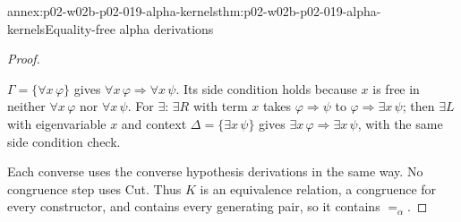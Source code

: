 \begin{annexitem}{annex:p02-w02b-p02-019-alpha-kernels}{thm:p02-w02b-p02-019-alpha-kernels}{Equality-free alpha derivations}
\begin{proof}
\begin{enumerate}
   \(\Gamma=\{\forall x\,\varphi\}\) gives
   \(\forall x\,\varphi\Rightarrow\forall x\,\psi\).  Its side condition
   holds because \(x\) is free in neither \(\forall x\,\varphi\) nor
   \(\forall x\,\psi\).  For \(\exists\): \(\exists R\) with term \(x\) takes
   \(\varphi\Rightarrow\psi\) to \(\varphi\Rightarrow\exists x\,\psi\); then
   \(\exists L\) with eigenvariable \(x\) and context
   \(\Delta=\{\exists x\,\psi\}\) gives
   \(\exists x\,\varphi\Rightarrow\exists x\,\psi\), with the same side
   condition check.
\end{enumerate}
Each converse uses the converse hypothesis derivations in the same way.  No
congruence step uses Cut.  Thus \(K\) is an equivalence relation, a
congruence for every constructor, and contains every generating pair, so it
contains \(=_{\alpha}\).
\end{proof}
\end{annexitem}


